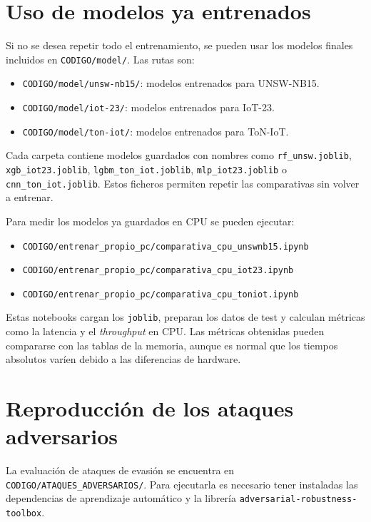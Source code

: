 \section{Uso de modelos ya entrenados}

Si no se desea repetir todo el entrenamiento, se pueden usar los modelos finales incluidos en \texttt{CODIGO/model/}. Las rutas son:

\begin{itemize}
    \item \texttt{CODIGO/model/unsw-nb15/}: modelos entrenados para UNSW-NB15.
    \item \texttt{CODIGO/model/iot-23/}: modelos entrenados para IoT-23.
    \item \texttt{CODIGO/model/ton-iot/}: modelos entrenados para ToN-IoT.
\end{itemize}

Cada carpeta contiene modelos guardados con nombres como \texttt{rf\_unsw.joblib}, \texttt{xgb\_iot23.joblib}, \texttt{lgbm\_ton\_iot.joblib}, \texttt{mlp\_iot23.joblib} o \texttt{cnn\_ton\_iot.joblib}. Estos ficheros permiten repetir las comparativas sin volver a entrenar.

Para medir los modelos ya guardados en CPU se pueden ejecutar:

\begin{itemize}
    \item \texttt{CODIGO/entrenar\_propio\_pc/comparativa\_cpu\_unswnb15.ipynb}
    \item \texttt{CODIGO/entrenar\_propio\_pc/comparativa\_cpu\_iot23.ipynb}
    \item \texttt{CODIGO/entrenar\_propio\_pc/comparativa\_cpu\_toniot.ipynb}
\end{itemize}

Estas notebooks cargan los \texttt{joblib}, preparan los datos de test y calculan métricas como la latencia y el \textit{throughput} en CPU. Las métricas obtenidas pueden compararse con las tablas de la memoria, aunque es normal que los tiempos absolutos varíen debido a las diferencias de hardware.

\section{Reproducción de los ataques adversarios}

La evaluación de ataques de evasión se encuentra en \texttt{CODIGO/ATAQUES\_ADVERSARIOS/}. Para ejecutarla es necesario tener instaladas las dependencias de aprendizaje automático y la librería \texttt{adversarial-robustness-toolbox}.

